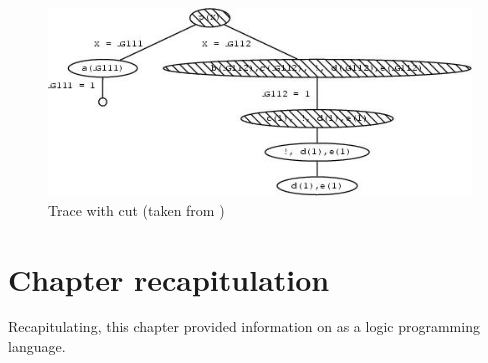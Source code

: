 \documentclass[thesis-solanki.tex]{subfiles}
\begin{document}
\begin{figure}[H]
\centering
\includegraphics[scale = .95]{prologcutrace.jpeg}
\caption{Trace with cut (taken from \cite{website:cutprologunionedu})}
\label{fig:Trace with cut}
\end{figure}

\section{Chapter recapitulation}
Recapitulating, this chapter provided information on  as a logic programming language.

\ifMain\ifDraft
\begin{scope}
  \nolinenumbers
  \enotesize
  \par
  \begin{singlespace}
  \setlength{\parskip}{12pt plus 2pt minus 1pt}
  \theendnotes
  \par
  \end{singlespace}
\end{scope}
\fi\fi
\end{document}
